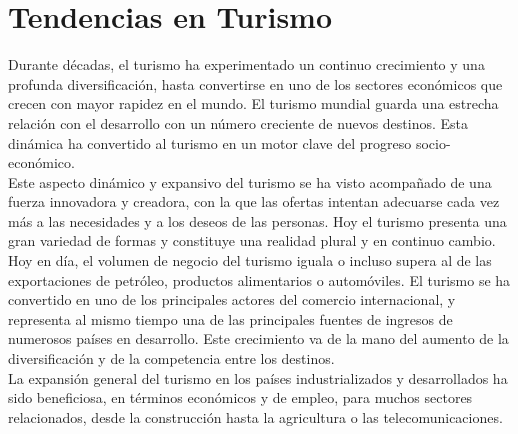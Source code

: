 \section{Tendencias en Turismo}

Durante décadas, el turismo ha experimentado un continuo crecimiento y una profunda diversificación, hasta convertirse en uno de los sectores económicos que crecen con mayor rapidez en el mundo. El turismo mundial guarda una estrecha relación con el desarrollo con un número creciente de nuevos destinos. Esta dinámica ha convertido al turismo en un motor clave del progreso socio-económico. \\

Este aspecto dinámico y expansivo del turismo se ha visto acompañado de una fuerza innovadora y creadora, con la que las ofertas intentan adecuarse cada vez más a las necesidades y a los deseos de las personas. Hoy el turismo presenta una gran variedad de formas y constituye una realidad plural y en continuo cambio.\\

Hoy en día, el volumen de negocio del turismo iguala o incluso supera al de las exportaciones de petróleo, productos alimentarios o automóviles. El turismo se ha convertido en uno de los principales actores del comercio internacional, y representa al mismo tiempo una de las principales fuentes de ingresos de numerosos países en desarrollo. Este crecimiento va de la mano del aumento de la diversificación y de la competencia entre los destinos.\\

La expansión general del turismo en los países industrializados y desarrollados ha sido beneficiosa, en términos económicos y de empleo, para muchos sectores relacionados, desde la construcción hasta la agricultura o las telecomunicaciones.